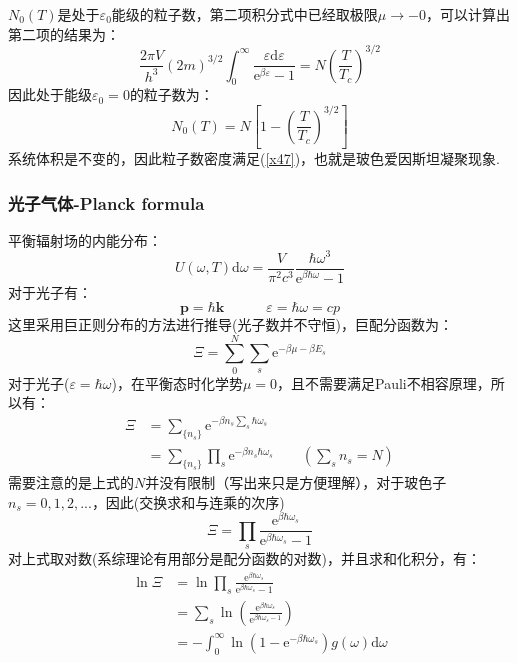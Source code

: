 \documentclass[12pt]{article}
\begin{document}
$N_0(T)$是处于$\varepsilon_0$能级的粒子数，第二项积分式中已经取极限$\mu \to -0$，可以计算出第二项的结果为：
\begin{equation}
	\frac{2\pi V}{h^3}(2m)^{3/2}\int_{0}^{\infty} \frac{\varepsilon\mathrm{d}\varepsilon}{\mathrm{e}^{\beta\varepsilon}-1}=N(\frac{T}{T_c})^{3/2}
\end{equation}
因此处于能级$\varepsilon_0=0$的粒子数为：
\begin{equation}
	N_0(T)=N[1-(\frac{T}{T_c})^{3/2}]
\end{equation}
系统体积是不变的，因此粒子数密度满足(\ref{x47})，也就是玻色爱因斯坦凝聚现象.
\subsubsection{光子气体-Planck formula}
\noindent
平衡辐射场的内能分布：
\begin{equation}
	U(\omega,T)\mathrm{d}\omega=\frac{V}{\pi^2 c^3}\frac{\hbar \omega^3}{\mathrm{e}^{\beta\hbar\omega}-1}
\end{equation}
对于光子有：
\begin{equation}
	\mathbf{p}=\hbar\mathbf{k}\quad\quad\quad\varepsilon=\hbar \omega=cp
	\label{x50}
\end{equation}
这里采用巨正则分布的方法进行推导(光子数并不守恒)，巨配分函数为：
\begin{equation}
	\Xi=\sum_{0}^{N}\sum_s \mathrm{e}^{-\beta\mu-\beta E_s}
\end{equation}
对于光子($\varepsilon=\hbar\omega$)，在平衡态时化学势$\mu=0$，且不需要满足Pauli不相容原理，所以有：
\begin{equation} 
	\begin{split}
		\Xi&=\sum_{\{n_s\}}\mathrm{e}^{-\beta n_s \sum_s \hbar\omega_s}\\
		&=\sum_{\{n_s\}}\prod_s \mathrm{e}^{-\beta n_s\hbar\omega_s }\quad\quad(\sum_s n_s=N)
	\end{split}
\end{equation}
需要注意的是上式的$N$并没有限制（写出来只是方便理解），对于玻色子$n_s=0,1,2,...$，因此(交换求和与连乘的次序)
\begin{equation}
	\Xi=\prod_s \frac{\mathrm{e}^{\beta\hbar\omega_s}}{\mathrm{e}^{\beta\hbar\omega_s}-1}
\end{equation}
对上式取对数(系综理论有用部分是配分函数的对数)，并且求和化积分，有：
\begin{equation}
	\begin{split}
	\ln \Xi&=\ln \prod_s \frac{\mathrm{e}^{\beta\hbar\omega_s}}{\mathrm{e}^{\beta\hbar\omega_s}-1}\\
	&=\sum_s \ln (\frac{\mathrm{e}^{\beta\hbar\omega_s}}{\mathrm{e}^{\beta\hbar\omega_s-1}})\\
	&=-\int_{0}^{\infty} \ln (1-\mathrm{e}^{-\beta\hbar\omega_s})g(\omega)\mathrm{d}\omega
\end{split}
\end{equation}
\end{document}
